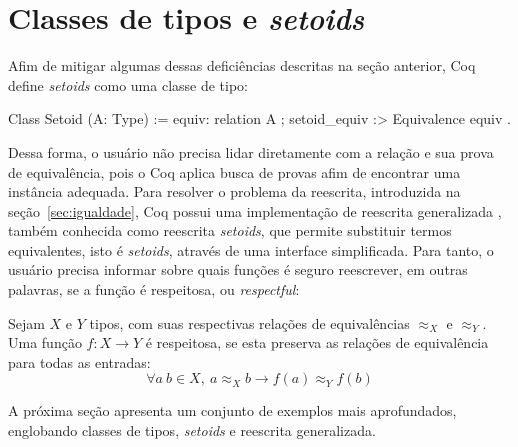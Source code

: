 \section{Classes de tipos e \textit{setoids}}\label{sec:classes-setoids}
Afim de mitigar algumas dessas deficiências descritas na seção anterior, Coq define \textit{setoids} como uma classe de tipo:
\begin{coqcode}
Class Setoid (A: Type) := {
   equiv: relation A ;
   setoid_equiv :> Equivalence equiv 
}.
\end{coqcode}
Dessa forma, o usuário não precisa lidar diretamente com a relação e sua prova de equivalência, pois o Coq aplica busca de provas afim de encontrar uma instância  adequada. Para resolver o problema da reescrita, introduzida na seção~\ref{sec:igualdade}, Coq possui uma implementação de reescrita generalizada \cite{Sozeau2009}, também conhecida como reescrita \textit{setoids}, que permite substituir termos equivalentes, isto é \textit{setoids}, através de uma interface simplificada. Para tanto, o usuário precisa informar sobre quais funções é seguro reescrever, em outras palavras, se a função é respeitosa, ou \textit{respectful}:
\begin{definicao}\label{def:respeitosa}
	Sejam $X$ e $Y$ tipos, com suas respectivas relações de equivalências $\approx_X$ e $\approx_Y$. Uma função $f: X \rightarrow Y$ é respeitosa, se esta preserva as relações de equivalência para todas as entradas:
	\begin{equation*}
		\forall a~b \in X,~a \approx_X b \rightarrow f(a) \approx_Y f(b)
	\end{equation*}
\end{definicao}\noindent
A próxima seção apresenta um conjunto de exemplos mais aprofundados, englobando classes de tipos, \textit{setoids} e reescrita generalizada.


